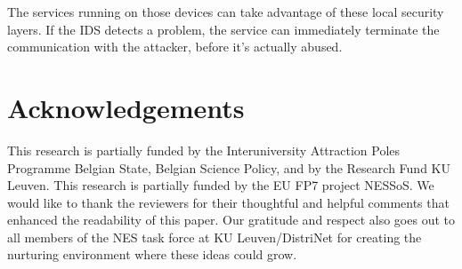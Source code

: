 \documentclass[conference]{IEEEtran}
\begin{document}
The services running on those devices can take advantage of these local
security layers. If the IDS detects a problem, the service can immediately
terminate the communication with the attacker, before it's actually abused.

\section*{Acknowledgements}

This research is partially funded by the Interuniversity Attraction Poles
Programme Belgian State, Belgian Science Policy, and by the Research Fund KU
Leuven. This research is partially funded by the EU FP7 project NESSoS. We
would like to thank the reviewers for their thoughtful and helpful comments
that enhanced the readability of this paper. Our gratitude and respect also
goes out to all members of the NES task force at KU Leuven/DistriNet for
creating the nurturing environment where these ideas could grow.



\end{document}
